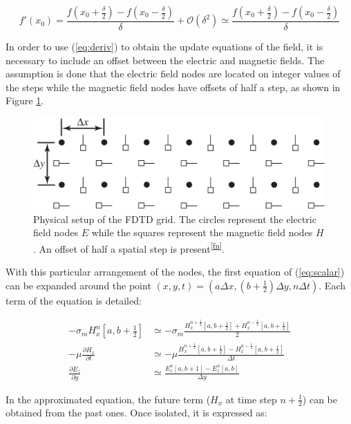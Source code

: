 \begin{equation}
	f'(x_0) = \frac{f\left(x_0 + \frac{\delta}{2}\right) - f\left(x_0 - \frac{\delta}{2}\right)}{\delta} + \mathcal{O}(\delta^2) \simeq \frac{f\left(x_0 + \frac{\delta}{2}\right) - f\left(x_0 - \frac{\delta}{2}\right)}{\delta}
	\label{eq:deriv}
\end{equation}

In order to use (\ref{eq:deriv}) to obtain the update equations of the field, it is necessary to include an offset between the electric and magnetic fields. The assumption is done that the electric field nodes are located on integer values of the steps while the magnetic field nodes have offsets of half a step, as shown in Figure \ref{fig:grid}.

\begin{figure}[H]
    \centering
    \includegraphics[width=.6\linewidth]{img/grid.png}
    \caption{Physical setup of the FDTD grid. The circles represent the electric field nodes $E$ while the squares represent the magnetic field nodes $H$. An offset of half a spatial step is present\textsuperscript{\ref{fn}}.}
    \label{fig:grid}
\end{figure}

With this particular arrangement of the nodes, the first equation of (\ref{eq:scalar}) can be expanded around the point $(x,y,t) = (a \Delta x, (b+\frac{1}{2}) \Delta y, n \Delta t)$. Each term of the equation is detailed:

\begin{equation}
	\begin{split}
	-\sigma_m H_x^n \left[a,b+\frac{1}{2}\right] &\simeq - \sigma_m \frac{H_x^{n+\frac{1}{2}}\left[a,b+\frac{1}{2}\right] + H_x^{n-\frac{1}{2}}\left[a,b+\frac{1}{2}\right] }{2}\\
	- \mu\frac{\partial H_x}{\partial t} &\simeq - \mu \frac{H_x^{n+\frac{1}{2}}\left[a,b+\frac{1}{2}\right] - H_x^{n-\frac{1}{2}}\left[a,b+\frac{1}{2}\right]}{\Delta t} \\
	\frac{\partial E_z}{\partial y} &\simeq \frac{E_z^{n}\left[a,b+1\right] - E_z^{n}[a,b]}{\Delta y}
	\end{split}
\end{equation}

In the approximated equation, the future term ($H_x$ at time step $n + \frac{1}{2}$) can be obtained from the past ones. Once isolated, it is expressed as: \vspace*{-0.7cm}

